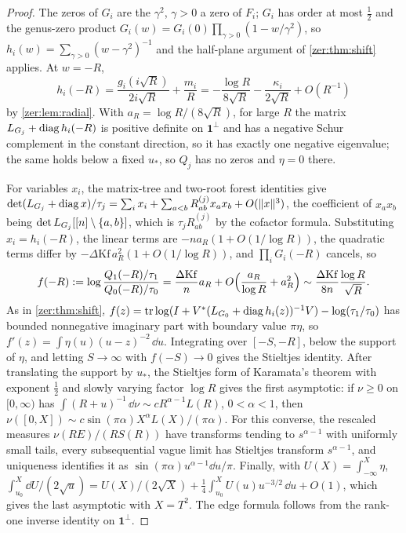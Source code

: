 \begin{proof}
The zeros of $G_i$ are the $\gamma^2$, $\gamma>0$ a zero of $F_i$; $G_i$ has order at most $\tfrac12$ and the
genus-zero product $G_i(w)=G_i(0)\prod_{\gamma>0}(1-w/\gamma^2)$, so $h_i(w)=\sum_{\gamma>0}(w-\gamma^2)^{-1}$
and the half-plane argument of \cref{zer:thm:shift} applies. At $w=-R$,
\[
 h_i(-R)=\frac{g_i(i\sqrt R)}{2i\sqrt R}+\frac{m_i}R=-\frac{\log R}{8\sqrt R}-\frac{\kappa_i}{2\sqrt R}+O(R^{-1})
\]
by \cref{zer:lem:radial}. With $a_R=\log R/(8\sqrt R)$, for large $R$ the matrix
$L_{G_j}+\operatorname{diag} h_i(-R)$ is positive definite on $\mathbf 1^\perp$ and has a negative Schur complement
in the constant direction, so it has exactly one negative eigenvalue; the same holds below a fixed
$u_*$, so $Q_j$ has no zeros and $\eta=0$ there.

For variables $x_i$, the matrix-tree and two-root forest identities give
$\det(L_{G_j}+\operatorname{diag} x)/\tau_j=\sum_ix_i+\sum_{a<b}R^{(j)}_{ab}x_ax_b+O(\lVert x\rVert^3)$, the coefficient of
$x_ax_b$ being $\det L_{G_j}[[n]\setminus\{a,b\}]$, which is $\tau_jR^{(j)}_{ab}$ by the cofactor formula.
Substituting $x_i=h_i(-R)$, the linear terms are $-na_R(1+O(1/\log R))$, the quadratic terms differ by
$-\Delta\mathrm{Kf}\,a_R^2(1+O(1/\log R))$, and $\prod_iG_i(-R)$ cancels, so
\[
 f(-R):=\log\frac{Q_1(-R)/\tau_1}{Q_0(-R)/\tau_0}=\frac{\Delta\mathrm{Kf}}na_R+O\Bigl(\frac{a_R}{\log R}+a_R^2\Bigr)\sim\frac{\Delta\mathrm{Kf}}{8n}\frac{\log R}{\sqrt R}.
\]
As in \cref{zer:thm:shift}, $f(z)=\operatorname{tr}\log(I+V^*(L_{G_0}+\operatorname{diag} h_i(z))^{-1}V)-\log(\tau_1/\tau_0)$ has bounded
nonnegative imaginary part with boundary value $\pi\eta$, so $f'(z)=\int\eta(u)(u-z)^{-2}\,\dd u$.
Integrating over $[-S,-R]$, below the support of $\eta$, and letting $S\to\infty$ with $f(-S)\to0$ gives
the Stieltjes identity. After translating the support by $u_*$, the Stieltjes form of Karamata's
theorem \cite[Theorem~A.7 and Remark~A.8]{LangerWoracek2025Karamata} with exponent $\tfrac12$ and slowly
varying factor $\log R$ gives the first asymptotic: if $\nu\ge0$ on $[0,\infty)$ has
$\int(R+u)^{-1}\,\dd\nu\sim cR^{\alpha-1}L(R)$, $0<\alpha<1$, then
$\nu([0,X])\sim c\sin(\pi\alpha)X^\alpha L(X)/(\pi\alpha)$. For this converse, the rescaled measures
$\nu(RE)/(RS(R))$ have transforms tending to $s^{\alpha-1}$ with uniformly small tails, every
subsequential vague limit has Stieltjes transform $s^{\alpha-1}$, and uniqueness identifies it as
$\sin(\pi\alpha)u^{\alpha-1}\dd u/\pi$. Finally, with $U(X)=\int_{-\infty}^X\eta$,
$\int_{u_0}^X\dd U/(2\sqrt u)=U(X)/(2\sqrt X)+\tfrac14\int_{u_0}^XU(u)u^{-3/2}\,\dd u+O(1)$, which gives the
last asymptotic with $X=T^2$. The edge formula follows from the rank-one inverse identity on
$\mathbf 1^\perp$.
\end{proof}

